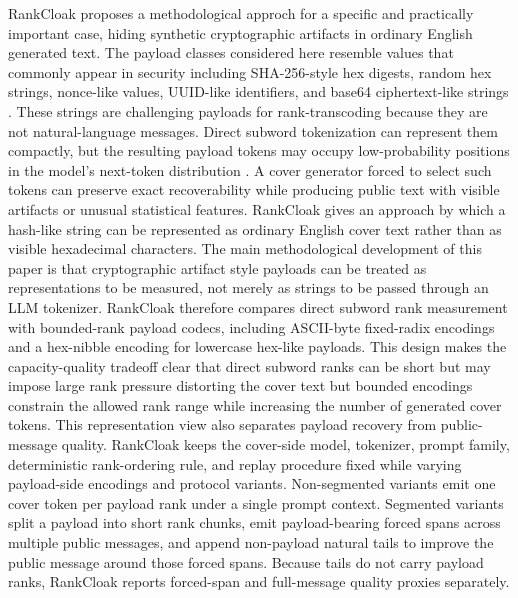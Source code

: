 \documentclass[fleqn,10pt]{wlscirep}
\begin{document}
RankCloak proposes a methodological approch for a specific and practically important case, hiding synthetic cryptographic artifacts in ordinary English generated text. The payload classes considered here resemble values that commonly appear in security including SHA-256-style hex digests, random hex strings, nonce-like values, UUID-like identifiers, and base64 ciphertext-like strings \cite{NIST2015SecureHashStandard,Josefsson2006RFC4648,DavisPeabodyLeach2024RFC9562}. These strings are challenging payloads for rank-transcoding because they are not natural-language messages. Direct subword tokenization can represent them compactly, but the resulting payload tokens may occupy low-probability positions in the model's next-token distribution \cite{Sennrich2016SubwordUnits,KudoRichardson2018SentencePiece}. A cover generator forced to select such tokens can preserve exact recoverability while producing public text with visible artifacts or unusual statistical features. RankCloak gives an approach by which a hash-like string can be represented as ordinary English cover text rather than as visible hexadecimal characters.
The main methodological development of this paper is that cryptographic artifact style payloads can be treated as representations to be measured, not merely as strings to be passed through an LLM tokenizer. RankCloak therefore compares direct subword rank measurement with bounded-rank payload codecs, including ASCII-byte fixed-radix encodings and a hex-nibble encoding for lowercase hex-like payloads. This design makes the capacity-quality tradeoff clear that direct subword ranks can be short but may impose large rank pressure distorting the cover text but bounded encodings constrain the allowed rank range while increasing the number of generated cover tokens.
This representation view also separates payload recovery from public-message quality. RankCloak keeps the cover-side model, tokenizer, prompt family, deterministic rank-ordering rule, and replay procedure fixed while varying payload-side encodings and protocol variants. Non-segmented variants emit one cover token per payload rank under a single prompt context. Segmented variants split a payload into short rank chunks, emit payload-bearing forced spans across multiple public messages, and append non-payload natural tails to improve the public message around those forced spans. Because tails do not carry payload ranks, RankCloak reports forced-span and full-message quality proxies separately.
\end{document}

